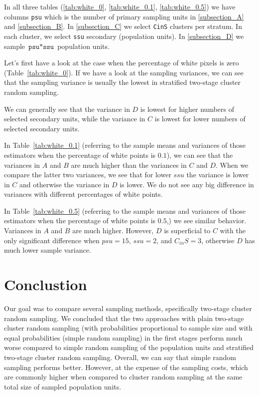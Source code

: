\documentclass{article}
\begin{document}

In all three tables (\ref{tab:white_0}, \ref{tab:white_0.1}, \ref{tab:white_0.5}) we have columns \texttt{psu} which is the number of primary sampling units in \ref{subsection_A} and \ref{subsection_B}. In \ref{subsection_C} we select \texttt{CinS} clusters per stratum. In each cluster, we select \texttt{ssu} secondary (population units). In \ref{subsection_D} we sample $\texttt{psu} * \texttt{ssu}$ population units.

Let's first have a look at the case when the percentage of white pixels is zero (Table~\ref{tab:white_0}). If we have a look at the sampling variances, we can see that the sampling variance is usually the lowest in stratified two-stage cluster random sampling. 

We can generally see that the variance in $D$ is lowest for higher numbers of selected secondary units, while the variance in $ C$ is lowest for lower numbers of selected secondary units.


In Table~\ref{tab:white_0.1} (referring to the sample means and variances of those estimators when the percentage of white points is $0.1$), we can see that the variances in $A$ and $B$ are much higher than the variances in $C$ and $D$. When we compare the latter two variances, we see that for lower $ssu$ the variance is lower in $C$ and otherwise the variance in $D$ is lower. We do not see any big difference in variances with different percentages of white points.

In Table~\ref{tab:white_0.5} (referring to the sample means and variances of those estimators when the percentage of white points is $0.5$,) we see similar behavior. Variances in $A$ and $B$ are much higher. However, $D$ is superficial to $C$ with the only significant difference when $psu=15$, $ssu=2$, and $C_{in}S = 3$, otherwise $D$ has much lower sample variance.



\section{Conclustion}
Our goal was to compare several sampling methods, specifically two-stage cluster random sampling. We concluded that the two approaches with plain two-stage cluster random sampling (with probabilities proportional to sample size and with equal probabilities (simple random sampling) in the first stages perform much worse compared to simple random sampling of the population units and stratified two-stage cluster random sampling. Overall, we can say that simple random sampling performs better. However, at the expense of the sampling costs, which are commonly higher when compared to cluster random sampling at the same total size of sampled population units.



\clearpage
\FloatBarrier
\end{document}

